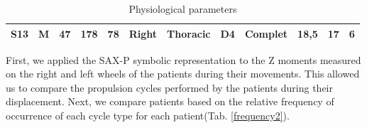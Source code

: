 \begin{landscape}
\begin{table}[h]
\begin{tabular}{|c|c|c|c|c|c|c|c|c|c|c|c|}
S13                                                    & M                                   & 47                                & 178                                       & 78                                        & Right                                                                                    & Thoracic                                                                                 & D4                                                                                         & Complet                                                                                     & 18,5                                                                                            & 17                                                                                         & 6                                                                                          \\ \hline
\end{tabular}
\caption{Physiological parameters}
\label{physio}
\end{table}

\end{landscape}

First, we applied the SAX-P symbolic representation to the Z moments measured on the right and left wheels of the patients during their movements. This allowed us to compare the propulsion cycles performed by the patients during their displacement. Next, we compare patients based on the relative frequency of occurrence of each cycle type for each patient(Tab. \ref{frequency2}). 


